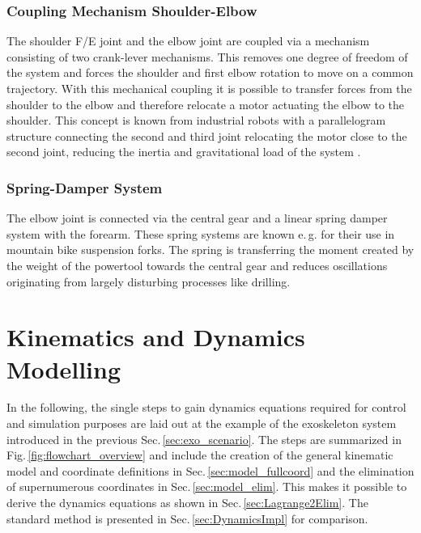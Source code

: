 \documentclass[twocolumn,10pt]{IFTOMM}
\begin{document}
\subsubsection{Coupling Mechanism Shoulder-Elbow}
\label{sec:exo_des_secoupl}

The shoulder F/E joint and the elbow joint are coupled via a mechanism consisting of two crank-lever mechanisms.
This removes one degree of freedom of the system and forces the shoulder and first elbow rotation to move on a common trajectory.
With this mechanical coupling it is possible to transfer forces from the shoulder to the elbow and therefore relocate a motor actuating the elbow to the shoulder.
This concept is known from industrial robots with a parallelogram structure connecting the second and third joint relocating the motor close to the second joint, reducing the inertia and gravitational load of the system \cite{LuhZhe1985}.

\subsubsection{Spring-Damper System}
\label{sec:exo_des_sprdamp}

The elbow joint is connected via the central gear and a linear spring damper system with the forearm.
These spring systems are known e.\,g. for their use in mountain bike suspension forks.
The spring is transferring the moment created by the weight of the powertool towards the central gear and reduces oscillations originating from largely disturbing processes like drilling.

\section{Kinematics and Dynamics Modelling}
\label{sec:model}

In the following, the single steps to gain dynamics equations required for control and simulation purposes are laid out at the example of the exoskeleton system introduced in the previous Sec.\,\ref{sec:exo_scenario}.
The steps are summarized in Fig.\,\ref{fig:flowchart_overview} and include the creation of the general kinematic model and coordinate definitions in Sec.\,\ref{sec:model_fullcoord} and the elimination of supernumerous coordinates in Sec.\,\ref{sec:model_elim}.
This makes it possible to derive the dynamics equations as shown in Sec.\,\ref{sec:Lagrange2Elim}.
The standard method is presented in Sec.\,\ref{sec:DynamicsImpl} for comparison.
\end{document}
